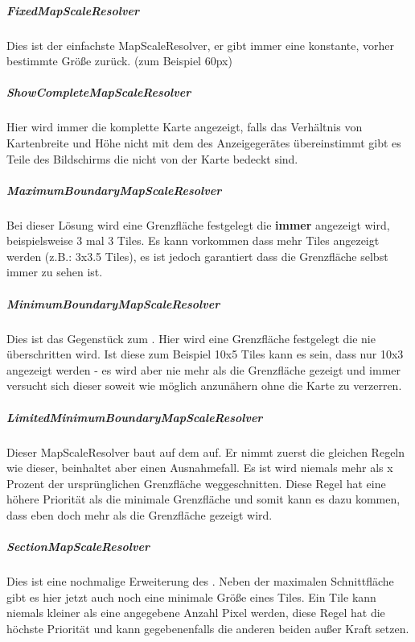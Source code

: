 \subparagraph{FixedMapScaleResolver} 
Dies ist der einfachste MapScaleResolver, er gibt immer eine konstante, vorher bestimmte Größe zurück. (zum Beispiel 60px)

  
\subparagraph{ShowCompleteMapScaleResolver} 
Hier wird immer die komplette Karte angezeigt, falls das Verhältnis von Kartenbreite und Höhe nicht mit dem des Anzeigegerätes übereinstimmt gibt es Teile des Bildschirms die nicht von der Karte bedeckt sind.

  
\subparagraph{MaximumBoundaryMapScaleResolver} 
Bei dieser Lösung wird eine Grenzfläche festgelegt die \textbf{immer} angezeigt wird, beispielsweise 3 mal 3 Tiles. 
Es kann vorkommen dass mehr Tiles angezeigt werden (z.B.: 3x3.5 Tiles), es ist jedoch garantiert dass die Grenzfläche selbst immer zu sehen ist.

  
\subparagraph{MinimumBoundaryMapScaleResolver} 
Dies ist das Gegenstück zum . 
Hier wird eine Grenzfläche festgelegt die nie überschritten wird. 
Ist diese zum Beispiel 10x5 Tiles kann es sein, dass nur 10x3 angezeigt werden - es wird aber nie mehr als die Grenzfläche gezeigt und immer versucht sich dieser soweit wie möglich anzunähern ohne die Karte zu verzerren.

  
\subparagraph{LimitedMinimumBoundaryMapScaleResolver} 
Dieser MapScaleResolver baut auf dem  auf. 
Er nimmt zuerst die gleichen Regeln wie dieser, beinhaltet aber einen Ausnahmefall. 
Es ist wird niemals mehr als x Prozent der ursprünglichen Grenzfläche weggeschnitten. 
Diese Regel hat eine höhere Priorität als die minimale Grenzfläche und somit kann es dazu kommen, dass eben doch mehr als die Grenzfläche gezeigt wird.

  
\subparagraph{SectionMapScaleResolver} 
Dies ist eine nochmalige Erweiterung des . 
Neben der maximalen Schnittfläche gibt es hier jetzt auch noch eine minimale Größe eines Tiles. 
Ein Tile kann niemals kleiner als eine angegebene Anzahl Pixel werden, diese Regel hat die höchste Priorität und kann gegebenenfalls die anderen beiden außer Kraft setzen.

